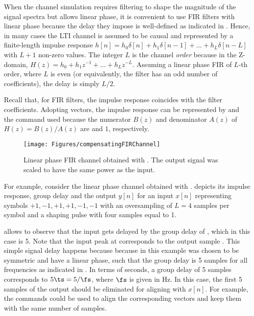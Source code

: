 When the channel simulation requires filtering to shape the magnitude of the signal spectra but allows linear phase, it is convenient to use FIR filters with linear phase because the delay they impose is well-defined as indicated in .
Hence, in many cases the LTI channel is assumed to be causal and represented by a finite-length impulse response $h[n]=h_0 \delta[n] + h_1 \delta[n-1] + \ldots + h_L \delta[n-L]$ with $L+1$ non-zero values. The integer $L$ is the channel \emph{order} because in the Z-domain, $H(z)=h_0 + h_1  z^{-1} + \ldots + h_L  z^{-L}$.
Assuming a linear phase FIR of $L$-th order, where $L$ is even (or equivalently, the filter has an odd number of coefficients), the delay is simply $L/2$.

Recall that, for FIR filters, the impulse response coincides with the filter coefficients. Adopting vectors, the impulse response can be represented by  and the command  used because the numerator $B(z)$ and denominator $A(z)$ of $H(z)=B(z)/A(z)$ are  and $1$, respectively.


\begin{figure}[htbp]
\centering
\texttt{[image: Figures/compensatingFIRChannel]}
\caption[{Linear phase FIR channel obtained with .}]{Linear phase FIR channel obtained with . The output signal was scaled to have the same power as the input.\label{fig:compensatingFIRChannel}}
\end{figure}

For example, consider the linear phase channel obtained with .
 depicts its impulse response, group delay and the output $y[n]$ for an input $x[n]$ representing symbols $+1,-1,+1,+1,-1,-1$ with an oversampling of $L=4$ samples per symbol and a shaping pulse with four samples equal to 1.

 allows to observe that the input gets delayed by the group delay of , which in this case is 5. Note that the input peak at  corresponds to the output sample . This simple signal delay happens because because  in this example was chosen to be symmetric and have a linear phase, such that the group delay is 5 samples for all frequencies as indicated in . In terms of seconds, a group delay of 5 samples corresponds to $5 \ts = 5/\fs$, where $\fs$ is given in Hz.
In this case, the first 5 samples of the output should be eliminated for aligning with $x[n]$. For example, the commands  could be used to align the corresponding vectors and keep them with the same number of samples.

